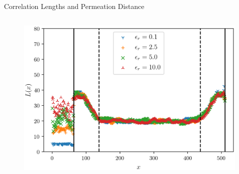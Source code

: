 \documentclass[aspectratio=169]{beamer}
\begin{document}
\begin{frame}[t]{Correlation Lengths and Permeation Distance}
\begin{columns}
\begin{column}{0.7\textwidth}
                \begin{figure}[h]
                    \centering
                    \includegraphics[height=0.72\textheight]{images/correlation_lengths.png}
                    \hspace{-30pt}
                    \label{fig:correlation_length}
                \end{figure}
            \end{column}
        \end{columns}
    \end{frame}





\end{document}

